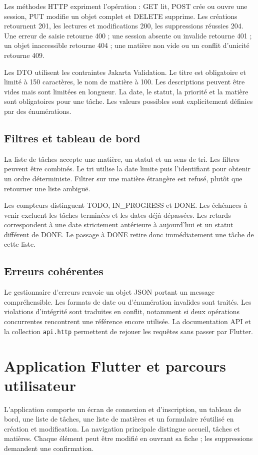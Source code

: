 \documentclass[11pt,a4paper]{article}
\begin{document}
Les méthodes HTTP expriment l'opération : GET lit, POST crée ou ouvre une session, PUT modifie un objet complet et DELETE supprime. Les créations retournent 201, les lectures et modifications 200, les suppressions réussies 204. Une erreur de saisie retourne 400 ; une session absente ou invalide retourne 401 ; un objet inaccessible retourne 404 ; une matière non vide ou un conflit d'unicité retourne 409.

Les DTO utilisent les contraintes Jakarta Validation. Le titre est obligatoire et limité à 150 caractères, le nom de matière à 100. Les descriptions peuvent être vides mais sont limitées en longueur. La date, le statut, la priorité et la matière sont obligatoires pour une tâche. Les valeurs possibles sont explicitement définies par des énumérations.

\subsection*{Filtres et tableau de bord}
La liste de tâches accepte une matière, un statut et un sens de tri. Les filtres peuvent être combinés. Le tri utilise la date limite puis l'identifiant pour obtenir un ordre déterministe. Filtrer sur une matière étrangère est refusé, plutôt que retourner une liste ambiguë.

Les compteurs distinguent TODO, IN\_PROGRESS et DONE. Les échéances à venir excluent les tâches terminées et les dates déjà dépassées. Les retards correspondent à une date strictement antérieure à aujourd'hui et un statut différent de DONE. Le passage à DONE retire donc immédiatement une tâche de cette liste.

\subsection*{Erreurs cohérentes}
Le gestionnaire d'erreurs renvoie un objet JSON portant un message compréhensible. Les formats de date ou d'énumération invalides sont traités. Les violations d'intégrité sont traduites en conflit, notamment si deux opérations concurrentes rencontrent une référence encore utilisée. La documentation API et la collection \texttt{api.http} permettent de rejouer les requêtes sans passer par Flutter.
\newpage
\section{Application Flutter et parcours utilisateur}
L'application comporte un écran de connexion et d'inscription, un tableau de bord, une liste de tâches, une liste de matières et un formulaire réutilisé en création et modification. La navigation principale distingue accueil, tâches et matières. Chaque élément peut être modifié en ouvrant sa fiche ; les suppressions demandent une confirmation.
\end{document}
